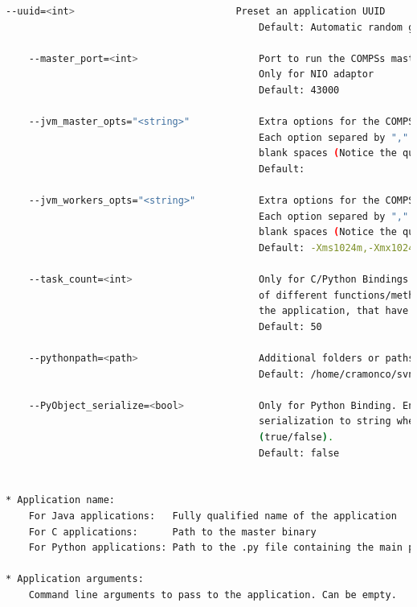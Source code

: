 \begin{lstlisting}[language=bash]
    --uuid=<int>                            Preset an application UUID
                                            Default: Automatic random generation
                                            
    --master_port=<int>                     Port to run the COMPSs master communications.
                                            Only for NIO adaptor
                                            Default: 43000
                                            
    --jvm_master_opts="<string>"            Extra options for the COMPSs Master JVM. 
                                            Each option separed by "," and without 
                                            blank spaces (Notice the quotes)
                                            Default: 
                                            
    --jvm_workers_opts="<string>"           Extra options for the COMPSs Workers JVMs.
                                            Each option separed by "," and without 
                                            blank spaces (Notice the quotes)
                                            Default: -Xms1024m,-Xmx1024m,-Xmn400m
                                            
    --task_count=<int>                      Only for C/Python Bindings. Maximum number 
                                            of different functions/methods, invoked from 
                                            the application, that have been selected as tasks
                                            Default: 50
                                            
    --pythonpath=<path>                     Additional folders or paths to add to the PYTHONPATH
                                            Default: /home/cramonco/svn/compss/framework/trunk/compss
                                            
    --PyObject_serialize=<bool>             Only for Python Binding. Enable the object 
                                            serialization to string when possible 
                                            (true/false).
                                            Default: false


* Application name:
    For Java applications:   Fully qualified name of the application
    For C applications:      Path to the master binary
    For Python applications: Path to the .py file containing the main program

* Application arguments:
    Command line arguments to pass to the application. Can be empty.                                          
\end{lstlisting}

